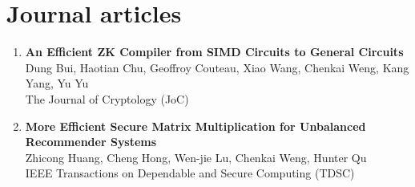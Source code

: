 \documentclass[letterpaper,11pt]{article}
\makeatletter
\newcommand{\resumeItem}[1]{
  \item\small{
    {#1 \vspace{-2pt}}
  }
}
\newcommand{\resumeProjectHeading}[2]{
    \item
    \begin{tabular*}{0.97\textwidth}{l@{\extracolsep{\fill}}r}
      \small#1 & #2 \\
    \end{tabular*}\vspace{-7pt}
}
\newcommand{\resumeSubHeadingListStart}{\begin{itemize}[leftmargin=0.15in, label={}]}
\newcommand{\resumeSubHeadingListEnd}{\end{itemize}}
\newcommand{\resumeItemListStart}{\begin{itemize}}
\newcommand{\resumeItemListEnd}{\end{itemize}\vspace{-5pt}}
\makeatother
\begin{document}

\section{Journal articles}
\begin{enumerate}[leftmargin=0.20in]
  \item 
    {\textbf{\small An Efficient ZK Compiler from SIMD Circuits to General Circuits}} \\
		{\small Dung Bui, Haotian Chu, Geoffroy Couteau, Xiao Wang, Chenkai Weng, Kang Yang, Yu Yu \vspace{-2pt}} \\
		{\small The Journal of Cryptology (JoC)}
  \item
    {\textbf{\small More Efficient Secure Matrix Multiplication for Unbalanced Recommender Systems}} \\
		{\small Zhicong Huang, Cheng Hong, Wen-jie Lu, Chenkai Weng, Hunter Qu \vspace{-2pt}} \\
		{\small IEEE Transactions on Dependable and Secure Computing (TDSC)}
\end{enumerate}
\end{document}
